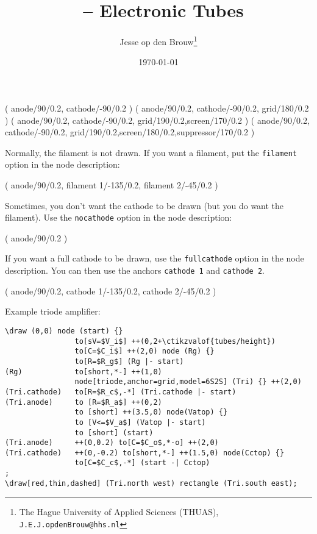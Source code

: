 \documentclass[a4paper]{article}
\author{Jesse op den Brouw\thanks{The Hague University of Applied Sciences (THUAS), \texttt{J.E.J.opdenBrouw@hhs.nl}}}
\title{\Circuitikz\ -- Electronic Tubes}
\date{\today}
\begin{document}



\begin{groupdesc}
	 ( anode/90/0.2, cathode/-90/0.2 )
	 ( anode/90/0.2, cathode/-90/0.2, grid/180/0.2 )
	 ( anode/90/0.2, cathode/-90/0.2, grid/190/0.2,screen/170/0.2 )
	 ( anode/90/0.2, cathode/-90/0.2, grid/190/0.2,screen/180/0.2,suppressor/170/0.2 )
\end{groupdesc}

Normally, the filament is not drawn. If you want a filament, put the \verb|filament| option in the node description:

\begin{groupdesc}
	 ( anode/90/0.2, filament 1/-135/0.2, filament 2/-45/0.2 )
\end{groupdesc}

Sometimes, you don't want the cathode to be drawn (but you do want the filament). Use the \verb|nocathode| option in the node description:

\begin{groupdesc}
	 ( anode/90/0.2 )
\end{groupdesc}

If you want a full cathode to be drawn, use the \verb|fullcathode| option in the node description. You can then use the anchors \verb|cathode 1| and \verb|cathode 2|.

\begin{groupdesc}
	 ( anode/90/0.2, cathode 1/-135/0.2, cathode 2/-45/0.2 )
\end{groupdesc}

Example triode amplifier:

\begin{lstlisting}
\draw (0,0) node (start) {}
                to[sV=$V_i$] ++(0,2+\ctikzvalof{tubes/height})
                to[C=$C_i$] ++(2,0) node (Rg) {}
                to[R=$R_g$] (Rg |- start)
(Rg)            to[short,*-] ++(1,0)
                node[triode,anchor=grid,model=6S2S] (Tri) {} ++(2,0)
(Tri.cathode)   to[R=$R_c$,-*] (Tri.cathode |- start)
(Tri.anode)     to [R=$R_a$] ++(0,2)
                to [short] ++(3.5,0) node(Vatop) {}
                to [V<=$V_a$] (Vatop |- start)
                to [short] (start)
(Tri.anode)     ++(0,0.2) to[C=$C_o$,*-o] ++(2,0)
(Tri.cathode)   ++(0,-0.2) to[short,*-] ++(1.5,0) node(Cctop) {}
                to[C=$C_c$,-*] (start -| Cctop)
;
\draw[red,thin,dashed] (Tri.north west) rectangle (Tri.south east);
\end{lstlisting}
\end{document}
